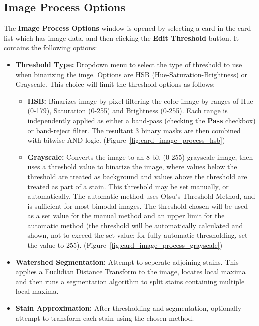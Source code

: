 \documentclass[10pt,letterpaper,titlepage]{article}
\begin{document}
    \subsection{Image Process Options}
    \label{sec:image_process}
    The \textbf{Image Process Options} window is opened by selecting a card in the card list which has image data, and then clicking the \textbf{Edit Threshold} button. It contains the following options:
    \begin{itemize}
        \item \textbf{Threshold Type:} Dropdown menu to select the type of threshold to use when binarizing the imge. Options are HSB (Hue-Saturation-Brightness) or Grayscale. This choice will limit the threshold options as follows:
        \begin{itemize}
            \item \textbf{HSB:} Binarizes image by pixel filtering the color image by ranges of Hue (0-179), Saturation (0-255) and Brightness (0-255). Each range is independently applied as either a band-pass (checking the \textbf{Pass} checkbox) or band-reject filter. The resultant 3 binary masks are then combined with bitwise AND logic. (Figure~\ref{fig:card_image_process_hsb})
            \item \textbf{Grayscale:} Converts the image to an 8-bit (0-255) grayscale image, then uses a threshold value to binarize the image, where values below the threshold are treated as background and values above the threshold are treated as part of a stain. This threshold may be set manually, or automatically. The automatic method uses Otsu's Threshold Method, and is sufficient for most bimodal images. The threshold chosen will be used as a set value for the manual method and an upper limit for the automatic method (the threshold will be automatically calculated and shown, not to exceed the set value; for fully automatic thresholding, set the value to 255). (Figure~\ref{fig:card_image_process_grayscale})
        \end{itemize}
        \item \textbf{Watershed Segmentation:} Attempt to seperate adjoining stains. This applies a Euclidian Distance Transform to the image, locates local maxima and then runs a segmentation algorithm to split stains containing multiple local maxima.
        \item \textbf{Stain Approximation:} After thresholding and segmentation, optionally attempt to transform each stain using the chosen method.
        \begin{itemize}

\end{itemize}
\end{itemize}
\end{document}
